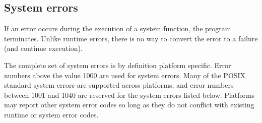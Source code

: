 \subsection*{System errors}

If an error occurs during the execution of a system
function, the program terminates. Unlike runtime errors, there is no way
to convert the error to a failure (and continue execution).

The complete set of system errors is by definition platform
specific. Error numbers above the value 1000 are used for system errors. Many of
the POSIX standard system errors are supported across platforms, and error
numbers between 1001 and 1040 are reserved for the system errors listed
below. Platforms may report other system error codes so long as they do not
conflict with existing runtime or system error codes.

